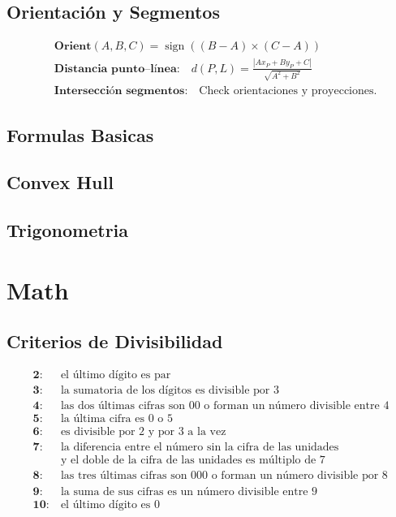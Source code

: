 \documentclass[10pt,landscape,twocolumn,a4paper,notitlepage]{article}
\begin{document}
\subsection{Orientación y Segmentos}
\begin{align}
  &\textbf{Orient}(A,B,C)=\operatorname{sign}((B-A)\times(C-A)) \\
  &\textbf{Distancia punto–línea:} \quad d(P,L)=\frac{|Ax_P+By_P+C|}{\sqrt{A^2+B^2}} \\
  &\textbf{Intersección segmentos:} \quad \text{Check orientaciones y proyecciones.}
\end{align}

\subsection{Formulas Basicas}
\subsection{Convex Hull}
\subsection{Trigonometria}

\section{Math}
\subsection{Criterios de Divisibilidad}
\begin{align*}
\textbf{2:} &\ \text{el último dígito es par} \\
\textbf{3:} &\ \text{la sumatoria de los dígitos es divisible por 3} \\
\textbf{4:} &\ \text{las dos últimas cifras son 00 o forman un número divisible entre 4} \\
\textbf{5:} &\ \text{la última cifra es 0 o 5} \\
\textbf{6:} &\ \text{es divisible por 2 y por 3 a la vez} \\
\textbf{7:} &\ \text{la diferencia entre el número sin la cifra de las unidades} \\
           &\ \text{y el doble de la cifra de las unidades es múltiplo de 7} \\
\textbf{8:} &\ \text{las tres últimas cifras son 000 o forman un número divisible por 8} \\
\textbf{9:} &\ \text{la suma de sus cifras es un número divisible entre 9} \\
\textbf{10:} &\ \text{el último dígito es 0}
\end{align*}
\end{document}
